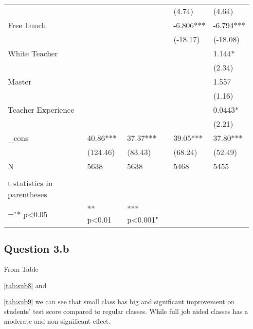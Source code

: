 \documentclass{article}
\begin{document}
{{{{{{{{{{{\begin{table}[htbp]
\begin{tabular}{lrllrr}
          &       &       &       & \multicolumn{1}{l}{(4.74)} & \multicolumn{1}{l}{(4.64)} \\
    \multicolumn{2}{l}{Free Lunch} &       &       & \multicolumn{1}{l}{-6.806***} & \multicolumn{1}{l}{-6.794***} \\
          &       &       &       & \multicolumn{1}{l}{(-18.17)} & \multicolumn{1}{l}{(-18.08)} \\
    \multicolumn{2}{l}{White Teacher} &       &       & \multicolumn{1}{l}{} & \multicolumn{1}{l}{1.144*} \\
          &       &       &       & \multicolumn{1}{l}{} & \multicolumn{1}{l}{(2.34)} \\
    \multicolumn{2}{l}{Master} &       &       & \multicolumn{1}{l}{} & \multicolumn{1}{l}{1.557} \\
          &       &       &       & \multicolumn{1}{l}{} & \multicolumn{1}{l}{(1.16)} \\
    \multicolumn{2}{l}{Teacher Experience} &       &       & \multicolumn{1}{l}{} & \multicolumn{1}{l}{0.0443*} \\
          &       &       &       & \multicolumn{1}{l}{} & \multicolumn{1}{l}{(2.21)} \\
    \multicolumn{2}{l}{\_cons} & 40.86*** & 37.37*** & \multicolumn{1}{l}{39.05***} & \multicolumn{1}{l}{37.80***} \\
          &       & (124.46) & (83.43) & \multicolumn{1}{l}{(68.24)} & \multicolumn{1}{l}{(52.49)} \\
    \multicolumn{2}{l}{N} & 5638  & 5638  & \multicolumn{1}{l}{5468} & \multicolumn{1}{l}{5455} \\
    \midrule
          &       &       &       &       &  \\
    t statistics in parentheses &       &       &       &       &  \\
    ="* p<0.05 &       &  ** p<0.01 &  *** p<0.001" &       &  \\
    \bottomrule
    \bottomrule
    \end{tabular}%
  \label{tab:addlabel}%
\end{table}%

\subsection*{Question 3.b}

From Table {\ref{tab:sub8} and {\ref{tab:sub9} we can see that small class has big and significant improvement on students' test score compared to regular classes. While full job aided classes has a moderate and non-significant effect.

}}}}}}}}}}}}}
\end{document}
